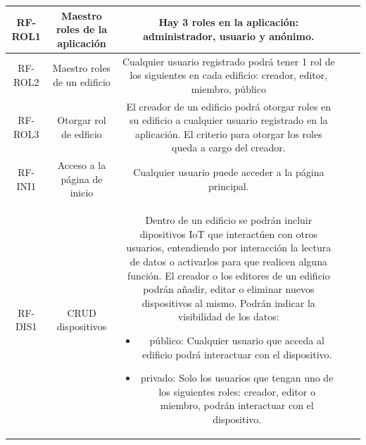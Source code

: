 \documentclass[12pt, a4paper, twoside]{article}
\begin{document}
\begin{center}
\begin{tabular}{ |c|c|c|c|c| }
  RF-ROL1 & Maestro roles de la aplicación & Hay 3 roles en la aplicación: administrador, usuario y anónimo. \\ \hline
  RF-ROL2 & Maestro roles de un edificio & Cualquier usuario registrado podrá tener 1 rol de los siguientes en cada edificio: creador, editor, miembro, público \\ \hline
  RF-ROL3 & Otorgar rol de edficio & El creador de un edificio podrá otorgar roles en su edificio a cualquier usuario registrado en la aplicación. El criterio para otorgar los roles queda a cargo del creador. \\ \hline

  RF-INI1 & Acceso a la página de inicio & Cualquier usuario puede acceder a la página principal. \\ \hline

  RF-DIS1 & CRUD dispositivos & Dentro de un edificio se podrán incluir dipositivos IoT que interactúen con otros usuarios, entendiendo por 
  interacción la lectura de datos o activarlos para que realicen alguna función.
  El creador o los editores de un edificio podrán añadir, editar o eliminar nuevos dispositivos al mismo. Podrán indicar la visibilidad de los datos: 
  \begin{itemize}
    \item público: Cualquier usuario que acceda al edificio podrá interactuar con el dispositivo.
    \item privado: Solo los usuarios que tengan uno de los siguientes roles: creador, editor o miembro, podrán interactuar con el dispositivo.
  \end{itemize}
  \\ \hline
  \end{tabular}
\end{center}
\end{document}
